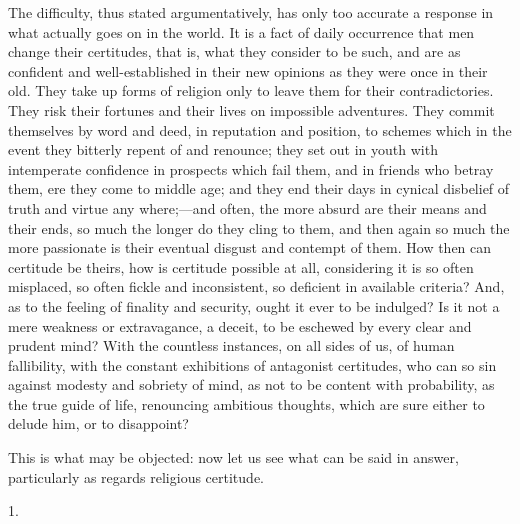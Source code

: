 The difficulty, thus stated argumentatively, has only too accurate
a response in what actually goes on in the world. It is a fact of
daily occurrence that men change their certitudes, that is, what they
consider to be such, and are as confident and well-established in
their new opinions as they were once in their old. They take up forms
of religion only to leave them for their contradictories. They risk
their fortunes and their lives on impossible adventures. They commit
themselves by word and deed, in reputation and position, to schemes
which in the event they bitterly repent of and renounce; they set out
in youth with intemperate confidence in prospects which fail them, and
in friends who betray them, ere they come to middle age; and they end
their days in cynical disbelief of truth and virtue any where;—and
often, the more absurd are their means and their ends, so much the
longer do they cling to them, and then again so much the more
passionate is their eventual disgust and contempt of them. How then
can certitude be theirs, how is certitude possible at all, considering
it is so often misplaced, so often fickle and inconsistent, so
deficient in available criteria? And, as to the feeling of finality
and security, ought it ever to be indulged? Is it not a mere weakness
or extravagance, a deceit, to be eschewed by every clear and prudent
mind? With the countless instances, on all sides of us, of human
fallibility, with the constant exhibitions of antagonist certitudes,
who can so sin against modesty and sobriety of mind, as not to be
content with probability, as the true guide of life, renouncing
ambitious thoughts, which are sure either to delude him, or to
disappoint?

This is what may be objected: now let us see what can be said in
answer, particularly as regards religious certitude.

1.


